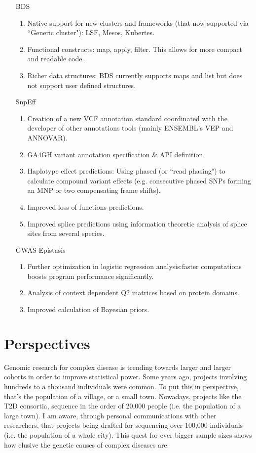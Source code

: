 \begin{enumerate}
\item[BDS]
	\begin{enumerate}
	\item Native support for new clusters and frameworks (that now supported via ``Generic cluster"): LSF, Mesos, Kubertes.
	\item Functional constructs: map, apply, filter. This allows for more compact and readable code.
	\item Richer data structures: BDS currently supports maps and list but does not support user defined structures.
	\end{enumerate}

\item[SnpEff]
	\begin{enumerate}
	\item Creation of a new VCF annotation standard coordinated with the developer of other annotations tools (mainly ENSEMBL’s VEP and ANNOVAR).
	\item GA4GH variant annotation specification \& API definition.
	\item Haplotype effect predictions: Using phased (or ``read phasing") to calculate compound variant effects (e.g. consecutive phased SNPs forming an MNP or two compensating frame shifts).
	\item Improved loss of functions predictions.
	\item Improved splice predictions using information theoretic analysis of splice sites from several species.
	\end{enumerate}

\item[GWAS Epistasis]
	\begin{enumerate}
	\item Further optimization in logistic regression analysis:faster computations boosts program performance significantly.
	\item Analysis of context dependent Q2 matrices based on protein domains.
	\item Improved calculation of Bayesian priors.
	\end{enumerate}
\end{enumerate}

\section{Perspectives}

Genomic research for complex disease is trending towards larger and larger cohorts in order to improve statistical power. Some years ago, projects involving hundreds to a thousand individuals were common. To put this in perspective, that’s the population of a village, or a small town. Nowadays, projects like the T2D consortia, sequence in the order of 20,000 people (i.e. the population of a large town). I am aware, through personal communications with other researchers, that projects being drafted for sequencing over 100,000 individuals (i.e. the population of a whole city). This quest for ever bigger sample sizes shows how elusive the genetic causes of complex diseases are. 

